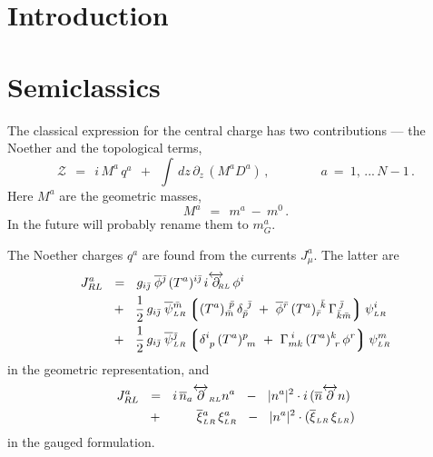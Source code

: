 \documentclass[epsfig,12pt]{article}
\def\beq{\begin{equation}}
\def\eeq{\end{equation}}
\def\beq{\begin{equation}}
\def\eeq{\end{equation}}
\newcommand{\p}{\partial}
\newcommand{\ov}{\overline}
\newcommand{\mc}[1]{\mathcal{#1}}
\newcommand{\lgr}{\left\lgroup}
\newcommand{\rgr}{\right\rgroup}
\newcommand{\bpsi}{\ov{\psi}{}}
\newcommand{\bphi}{\ov{\phi}{}}
\newcommand{\bxi}{\ov{\xi}{}}
\newcommand{\bj}{{\bar \jmath}}
\newcommand{\bmm}{{\bar m}}
\newcommand{\bp}{{\bar p}}
\newcommand{\bkk}{{\bar k}}
\newcommand{\br}{{\bar r}}
\begin{document}
\section{Introduction}
\setcounter{equation}{0}

\newpage

\section{Semiclassics}
\setcounter{equation}{0}

       The classical expression for the central charge has two contributions \cite{ls1} ---
       the Noether and the topological terms,
\beq
        \mc{Z} ~~=~~ i\, M^a\, q^a  ~~+~~ \int\, dz\, \p_z\, ( M^a D^a )\,, \qquad\qquad
	a ~=~ 1,\,...\, N-1\,.
\eeq
       Here $ M^a $ are the geometric masses,
\beq
       M^a  ~~=~~ m^a ~-~ m^0\,.
\eeq
       In the future will probably rename them to $ m_G^a $.

       The Noether charges $ q^a $ are found from the currents $ J_\mu^a $.
       The latter are
\begin{align}
%
\notag
       J_{RL}^a  & ~~=~~ g_{i\bj}\; \bphi^\bj\, (T^a)^{i\bj}\, i\overleftrightarrow{\p}{}_{\scriptscriptstyle \!\!\!\!RL}\, \phi^i   \\
%
                 & ~~+~~ \frac{1}{2}\, g_{i\bj}\; \bpsi{}_{\scriptscriptstyle LR}^\bmm 
                         \lgr  ( T^a )_\bmm^{\ \bp}\, \delta_\bp^{\ \bj} ~+~ 
	                       \bphi{}^\br\, (T^a)_\br^{\ \bkk}\, \Gamma^{\;\bj}_{\bkk\bmm} \rgr   \psi_{\scriptscriptstyle LR}^i  \\
%
\notag
                 & ~~+~~ \frac{1}{2}\, g_{i\bj}\; \bpsi{}_{\scriptscriptstyle LR}^\bj
                         \lgr  \delta^i_{\ p}\, (T^a)^p_{\ m} ~+~ 
		               \Gamma_{mk}^{\;i}\, (T^a)^k_{\ r}\, \phi^r \rgr   \psi_{\scriptscriptstyle LR}^m
\end{align}
       in the geometric representation, and
\begin{align}
%
\notag
       J_{RL}^a  & ~~=~~ i\, \ov{n}{}_a \overleftrightarrow{\p}_{\scriptscriptstyle RL} n^a 
                   ~~-~~ |n^a|^2 \cdot i\, ( \ov{n} \overleftrightarrow{\p} n ) \\
%
                 & ~~+~~ \qquad 
                         \bxi{}_{\scriptscriptstyle LR}^a\, \xi_{\scriptscriptstyle LR}^a  ~~-~~
                         |n^a|^2 \cdot ( \bxi{}_{\scriptscriptstyle LR}\, \xi_{\scriptscriptstyle LR} )
\end{align}
       in the gauged formulation.
\end{document}
